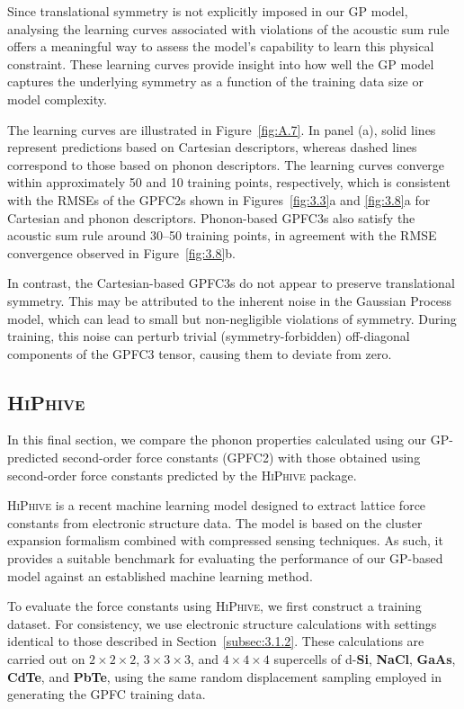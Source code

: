 Since translational symmetry is not explicitly imposed in our GP model, analysing the learning curves associated with violations of the acoustic sum rule offers a meaningful way to assess the model’s capability to learn this physical constraint. These learning curves provide insight into how well the GP model captures the underlying symmetry as a function of the training data size or model complexity.

The learning curves are illustrated in Figure~\ref{fig:A.7}. In panel (a), solid lines represent predictions based on Cartesian descriptors, whereas dashed lines correspond to those based on phonon descriptors. The learning curves converge within approximately 50 and 10 training points, respectively, which is consistent with the RMSEs of the GPFC2s shown in Figures~\ref{fig:3.3}a and \ref{fig:3.8}a for Cartesian and phonon descriptors. Phonon-based GPFC3s also satisfy the acoustic sum rule around 30–50 training points, in agreement with the RMSE convergence observed in Figure~\ref{fig:3.8}b.

In contrast, the Cartesian-based GPFC3s do not appear to preserve translational symmetry. This may be attributed to the inherent noise in the Gaussian Process model, which can lead to small but non-negligible violations of symmetry. During training, this noise can perturb trivial (symmetry-forbidden) off-diagonal components of the GPFC3 tensor, causing them to deviate from zero.

\subsection{\textsc{HiPhive}} \label{sec:A.2.4}
In this final section, we compare the phonon properties calculated using our GP-predicted second-order force constants (GPFC2) with those obtained using second-order force constants predicted by the \textsc{HiPhive} package.

\textsc{HiPhive} \cite{Eriksson2019} is a recent machine learning model designed to extract lattice force constants from electronic structure data. The model is based on the cluster expansion formalism combined with compressed sensing techniques. As such, it provides a suitable benchmark for evaluating the performance of our GP-based model against an established machine learning method.

To evaluate the force constants using \textsc{HiPhive}, we first construct a training dataset. For consistency, we use electronic structure calculations with settings identical to those described in Section~\ref{subsec:3.1.2}. These calculations are carried out on $2\times2\times2$, $3\times3\times3$, and $4\times4\times4$ supercells of d-\textbf{Si}, \textbf{NaCl}, \textbf{GaAs}, \textbf{CdTe}, and \textbf{PbTe}, using the same random displacement sampling employed in generating the GPFC training data. 

